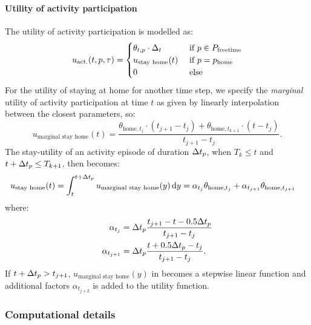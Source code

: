 \paragraph{Utility of activity participation}
The utility of activity participation is modelled as:
\begin{equation} \label{eq:uact}
	\uact(t,p,\atime) = \begin{cases} 
	\theta_{t,p} \cdot \Delta_t &\cif p \in P_{\text{freetime}} \\
	u_\text{stay home}(t) & \cif p = p_\text{home} \\
	0 & \celse
	\end{cases}
\end{equation}
\newcommand{\home}{\text{home}}
 For the utility of staying at home for another time step, we specify the \emph{marginal} utility of activity participation at time $t$ as given by linearly interpolation between the closest parameters, so:
\begin{equation*}
u_\text{marginal stay home}(t) = \frac{\theta_{\home,t_j}\cdot(t_{j+1}-t_j)+\theta_{\home,t_{k+1}}\cdot(t-t_j) }{t_{j+1}-t_{j}}.
\end{equation*}
The stay-utility of an activity episode of duration $\Delta t_p$, when $T_k\leq t$ and $t+\Delta t_p\leq T_{k+1}$, then becomes:
\begin{equation} \label{eq:uacttime}
\begin{aligned}
u_\text{stay home}(t) &= \int_t^{t+\dura{p}} u_\text{marginal stay home}(y)
\ud{y} = \alpha_{t_j}\theta_{\home,t_j} + \alpha_{t_{j+1}}\theta_{\home,t_{j+1}}%
\end{aligned}
\end{equation}
where:
\begin{align*}
\alpha_{t_j}&=\dura{p}\frac{t_{j+1} - t - 0.5 \dura{p}}{t_{j+1}-t_{j}}\\
\alpha_{t_{j+1}}&=\dura{p}\frac{t + 0.5\dura{p} - t_j}{t_{j+1}-t_{j}}.
\end{align*}
If $t+\Delta t_p> t_{j+1}$, $u_\text{marginal stay home}(y)$ in  becomes a stepwise linear function and additional factors $\alpha_{t_{j+2}}$ is added to the utility function.

\subsubsection{Computational details}
\label{seq:computationTime}

